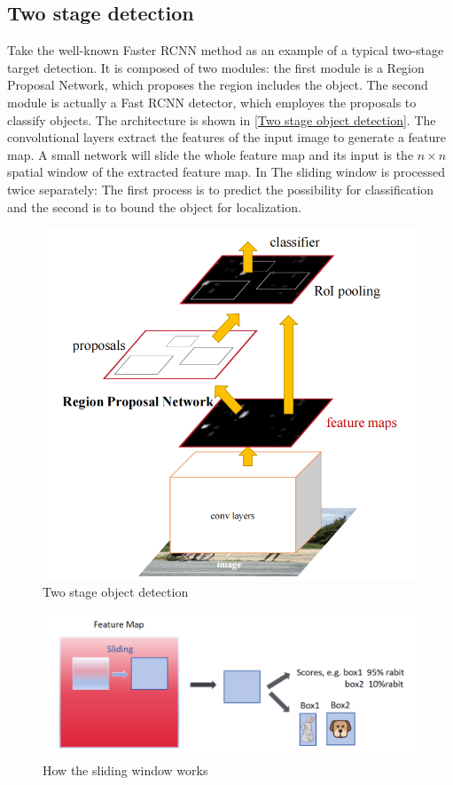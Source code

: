 \subsection{Two stage detection}
  Take the well-known Faster RCNN method as an example of a typical two-stage target detection\cite{NIPS2015_14bfa6bb}. It is composed of two modules: the 
  first module is a Region Proposal Network, which proposes the region includes the object. The second module is actually a Fast RCNN detector, which employes
  the proposals to classify objects. The architecture is shown in \autoref{Two stage object detection}. The convolutional layers extract the features of the 
  input image to generate a feature map. A small network will slide the whole feature map and its input is the $n \times n$ spatial window of the extracted feature map.
  In The sliding window is processed twice separately: The first process is to predict the possibility for classification and the second is to bound the object for localization. 
  \begin{figure}
    \centering
    \includegraphics[width=0.6\linewidth]{example_images/two_stage_detection}
    \caption{Two stage object detection\cite{NIPS2015_14bfa6bb}}
    \label{Two stage object detection}
  \end{figure}
  \begin{figure}
    \centering
    \includegraphics[width=0.9\linewidth]{example_images/Region Proposal}
    \caption{How the sliding window works}
    \label{How the sliding window works}
  \end{figure}
